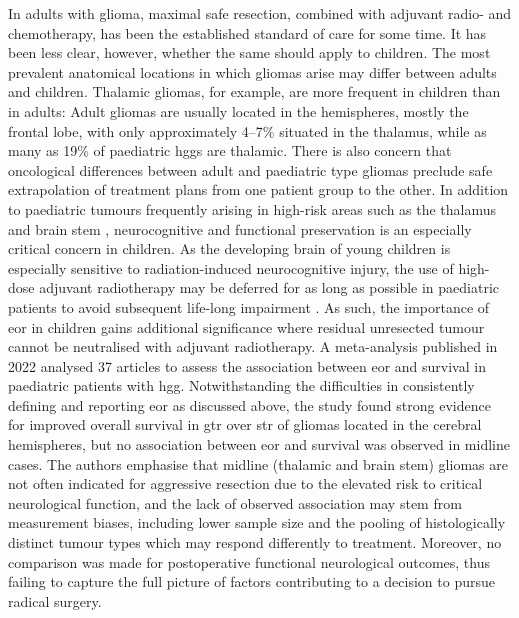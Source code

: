 \documentclass[12pt,phd,a4paper,twoside]{ucl_thesis}
\providecommand{\DIFaddtex}[1]{{\protect\color{blue} \sf #1}} %
\providecommand{\DIFaddbegin}{} %
\providecommand{\DIFaddend}{} %
\providecommand{\DIFadd}[1]{\texorpdfstring{\DIFaddtex{#1}}{#1}} %
\newcommand{\DIFaddincludegraphics}[2][]{{\color{blue}\fbox{\DIFOincludegraphics[#1]{#2}}}} %
\DeclareRobustCommand{\DIFaddbegin}{\DIFOaddbegin \let\includegraphics\DIFaddincludegraphics} %
\DeclareRobustCommand{\DIFaddend}{\DIFOaddend \let\includegraphics\DIFOincludegraphics} %
\begin{document}
In adults with glioma, maximal safe resection, combined with adjuvant radio- and chemotherapy, has been the established standard of care for some time.
It has been less clear, however, whether the same should apply to children.
The most prevalent anatomical locations in which gliomas arise may differ between adults and children\autocite{Duffau2004}.
Thalamic gliomas, for example, are more frequent in children than in adults\autocite{Cinalli2018,Palmisciano2021,GomezVecchio2021}:
Adult gliomas are usually located in the hemispheres, mostly the frontal lobe, with only approximately 4--7\%\autocite{GomezVecchio2021,Larjavaara2007} situated in the thalamus, while as many as 19\% of paediatric \glspl{hgg} are thalamic\autocite{McCrea2015}.
There is also concern that oncological differences between adult and paediatric type gliomas preclude safe extrapolation of treatment plans from one patient group to the other\autocite{Jones2012,Greuter2021}.
In addition to paediatric tumours frequently arising in high-risk areas such as the thalamus and brain stem \autocite{Ostrom2015}, neurocognitive and functional preservation is an especially critical concern in children.
\DIFaddbegin \DIFadd{As the developing brain of young children is especially sensitive to radiation-induced neurocognitive injury, the use of high-dose adjuvant radiotherapy may be deferred for as long as possible in paediatric patients to avoid subsequent life-long impairment}\autocite{Padovani2012,Moxon-Emre2014}\DIFadd{.
As such, the importance of }\gls{eor} \DIFadd{in children gains additional significance where residual unresected tumour cannot be neutralised with adjuvant radiotherapy.
}\DIFaddend A meta-analysis published in 2022 analysed 37 articles to assess the association between \gls{eor} and survival in paediatric patients with \gls{hgg}\autocite{Hatoum2022}.
Notwithstanding the difficulties in consistently defining and reporting \gls{eor} as discussed above, the study found strong evidence for improved overall survival in \gls{gtr} over \gls{str} of gliomas located in the cerebral hemispheres, but no association between \gls{eor} and survival was observed in midline cases.
The authors emphasise that midline (thalamic and brain stem) gliomas are not often indicated for aggressive resection due to the elevated risk to critical neurological function, and the lack of observed association may stem from measurement biases, including lower sample size and the pooling of histologically distinct tumour types which may respond differently to treatment.
Moreover, no comparison was made for postoperative functional neurological outcomes, thus failing to capture the full picture of factors contributing to a decision to pursue radical surgery.
\end{document}
